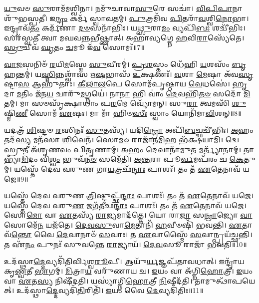 \-\ul{𑌯𑍁}\-𑌵𑍞 \ul{𑌸𑍁}\-𑌰𑌾𑌮᳴𑌮𑌶𑍍𑌵𑌿𑌨𑌾।
𑌨𑌮𑍁᳴𑌚𑌾𑌵𑌾\-\ul{𑌸𑍁}\-𑌰𑍇 𑌸𑌚𑌾॑।
\-\ul{𑌵𑌿}\-\-\ul{𑌪𑌿}\-\-\ul{𑌪𑌾}\-𑌨𑌾 𑌶𑍁᳴𑌭𑌸𑍍𑌪𑌤𑍀।
𑌇\-\ul{𑌨𑍍𑌦𑍍𑌰𑌂} 𑌕𑌰𑍍𑌮᳴ 𑌸𑍍𑌵𑌾𑌵𑌤𑌮𑍍।
\-\ul{𑌪𑍁}\-𑌤𑍍𑌰𑌮𑌿᳴𑌵 \ul{𑌪𑌿}\-𑌤𑌰𑌾᳴\-\ul{𑌵}\-𑌶𑍍𑌵𑌿\-\ul{𑌨𑍋}\-𑌭𑌾।
𑌇𑌨𑍍𑌦𑍍𑌰𑌾𑌵᳴\-\ul{𑌤𑌂} 𑌕𑌰𑍍𑌮᳴𑌣𑌾 \ul{𑌦}\-\-\ul{𑍞}\-𑌸𑌨𑌾᳴𑌭𑌿𑌃।
𑌯\-\ul{𑌥𑍍𑌸𑍁}\-𑌰𑌾\-\ul{𑌮𑌂} 𑌵𑍍𑌯𑌪𑌿᳴\-\ul{𑌬𑌃} 𑌶𑌚𑍀᳴𑌭𑌿𑌃।
𑌸𑌰᳴𑌸𑍍𑌵𑌤𑍀 𑌤𑍍𑌵𑌾 𑌮𑌘𑌵𑌨𑍍𑌨𑌭𑍀𑌷𑍍𑌣𑌾𑌤𑍍।
𑌅𑌹𑌾॑𑌵𑍍𑌯𑌗𑍍𑌨𑍇 \ul{𑌹}\-𑌵𑌿\-\ul{𑌰𑌾}\-𑌸𑍍𑌯𑍇᳴𑌤𑍇।
\-\ul{𑌸𑍍𑌰𑍁}\-𑌚𑍀𑌵᳴ \ul{𑌘𑍃}\-𑌤𑌂 \ul{𑌚}\-𑌮𑍂 𑌇᳴\-\ul{𑌵} 𑌸𑍋𑌮𑌃᳴॥7॥

\-\ul{𑌵𑌾}\-\-\ul{𑌜}\-𑌸𑌨𑌿𑍞᳴ \ul{𑌰}\-𑌯𑌿\-\ul{𑌮}\-𑌸𑍍𑌮𑍇 \ul{𑌸𑍁}\-𑌵𑍀𑌰𑌮𑍍॑।
\-\ul{𑌪𑍍𑌰}\-\-\ul{𑌶}\-𑌸𑍍𑌤𑌂 𑌧𑍇᳴𑌹𑌿 \ul{𑌯}\-𑌶𑌸𑌂᳴ \ul{𑌬𑍃}\-𑌹𑌨𑍍𑌤𑌮𑍍॑।
𑌯\-\ul{𑌸𑍍𑌮𑌿}\-𑌨𑍍𑌨𑌶𑍍𑌵𑌾᳴𑌸 𑌋\-\ul{𑌷}\-𑌭𑌾𑌸᳴ \ul{𑌉}\-𑌕𑍍𑌷𑌣𑌃᳴।
\-\ul{𑌵}\-𑌶𑌾 \ul{𑌮𑍇}\-𑌷𑌾 𑌅᳴𑌵\-\ul{𑌸𑍃}\-𑌷𑍍𑌟𑌾\-\ul{𑌸} 𑌆𑌹𑍁᳴𑌤𑌾𑌃।
\-\ul{𑌕𑍀}\-\-\ul{𑌲𑌾}\-\-\ul{𑌲}\-𑌪𑍇 𑌸𑍋𑌮᳴𑌪𑍃𑌷𑍍𑌠𑌾𑌯 \ul{𑌵𑍇}\-𑌧𑌸𑍇॑।
\-\ul{𑌹𑍃}\-𑌦𑌾 \ul{𑌮}\-𑌤𑌿𑌂 𑌜᳴𑌨\-\ul{𑌯} 𑌚𑌾𑌰𑍁᳴\-\ul{𑌮}\-𑌗𑍍𑌨𑌯𑍇॑।
𑌨𑌾\-\ul{𑌨𑌾} 𑌹𑌿 𑌵𑌾𑌂॑ \ul{𑌦𑍇}\-𑌵𑌹𑌿᳴\-\ul{𑌤}\-\-\ul{𑍞} 𑌸𑌦𑍋᳴ \ul{𑌮𑌿}\-𑌤𑌮𑍍।
𑌮𑌾 𑌸𑍞𑌸𑍃᳴𑌕𑍍𑌷𑌾𑌥𑌾𑌂 𑌪\-\ul{𑌰}\-𑌮𑍇 𑌵𑍍𑌯𑍋᳴𑌮𑌨𑍍।
𑌸𑍁\-\ul{𑌰𑌾} 𑌤𑍍𑌵𑌮𑌸𑌿᳴ \ul{𑌶𑍁}\-𑌷𑍍𑌮𑌿\-\ul{𑌣𑍀} 𑌸𑍋𑌮᳴ \ul{𑌏}\-𑌷𑌃।
𑌮𑌾 𑌮𑌾᳴ 𑌹𑌿𑍞\-\ul{𑌸𑍀𑌃} 𑌸𑍍𑌵𑌾𑌂 𑌯𑍋𑌨𑌿᳴𑌮𑌾\-\ul{𑌵𑌿}\-𑌶𑌨𑍍॥8॥

𑌯𑌦𑌤𑍍𑌰᳴ \ul{𑌶𑌿}\-𑌷𑍍𑌟𑍞 \ul{𑌰}\-𑌸𑌿𑌨𑌃᳴ \ul{𑌸𑍁}\-𑌤𑌸𑍍𑌯᳴।
𑌯𑌦𑌿\-\ul{𑌨𑍍𑌦𑍍𑌰𑍋} 𑌅𑌪𑌿᳴\-\ul{𑌬}\-𑌚𑍍𑌛𑌚𑍀᳴𑌭𑌿𑌃।
\-\ul{𑌅}\-𑌹𑌂 𑌤𑌦᳴\-\ul{𑌸𑍍𑌯} 𑌮𑌨᳴𑌸𑌾 \ul{𑌶𑌿}\-𑌵𑍇𑌨᳴।
𑌸𑍋\-\ul{𑌮}\-\-\ul{𑍞} 𑌰𑌾𑌜𑌾᳴𑌨\-\ul{𑌮𑌿}\-𑌹 𑌭᳴𑌕𑍍𑌷𑌯𑌾𑌮𑌿।
𑌦𑍍𑌵𑍇 \ul{𑌸𑍍𑌰𑍁}\-𑌤𑍀 𑌅᳴𑌶𑍃𑌣𑌵𑌂 𑌪𑌿\-\ul{𑌤𑍃}\-𑌣𑌾𑌮𑍍।
\-\ul{𑌅}\-𑌹𑌂 \ul{𑌦𑍇}\-𑌵𑌾𑌨𑌾᳴\-\ul{𑌮𑍁}\-𑌤 𑌮𑌰𑍍𑌤𑍍𑌯𑌾᳴𑌨𑌾𑌮𑍍।
𑌤𑌾𑌭𑍍𑌯𑌾᳴\-\ul{𑌮𑌿}\-𑌦𑌂 𑌵𑌿\-\ul{𑌶𑍍𑌵𑌂} 𑌭𑍁𑌵᳴\-\ul{𑌨}\-\-\ul{𑍞} 𑌸𑌮𑍇᳴𑌤𑌿।
\-\ul{𑌅}\-\-\ul{𑌨𑍍𑌤}\-𑌰𑌾 𑌪𑍂\-\ul{𑌰𑍍𑌵}\-𑌮𑌪᳴𑌰𑌂 𑌚 \ul{𑌕𑍇}\-𑌤𑍁𑌮𑍍।
𑌯𑌸𑍍𑌤𑍇᳴ 𑌦𑍇𑌵 𑌵𑌰𑍁𑌣 𑌗𑌾\-\ul{𑌯}\-𑌤𑍍𑌰𑌛᳴\-\ul{𑌨𑍍𑌦𑌾𑌃} 𑌪𑌾𑌶𑌃᳴।
𑌤𑌂 𑌤᳴ \ul{𑌏}\-𑌤𑍇𑌨𑌾𑌵᳴ 𑌯𑌜𑍇॥9॥

𑌯𑌸𑍍𑌤𑍇᳴ 𑌦𑍇𑌵 𑌵𑌰𑍁𑌣 \ul{𑌤𑍍𑌰𑌿}\-𑌷𑍍𑌟𑍁𑌪𑍍𑌛᳴\-\ul{𑌨𑍍𑌦𑌾𑌃} 𑌪𑌾𑌶𑌃᳴।
𑌤𑌂 𑌤᳴ \ul{𑌏}\-𑌤𑍇𑌨𑌾𑌵᳴ 𑌯𑌜𑍇।
𑌯𑌸𑍍𑌤𑍇᳴ 𑌦𑍇𑌵 𑌵𑌰𑍁\-\ul{𑌣} 𑌜𑌗᳴𑌤𑍀𑌛\-\ul{𑌨𑍍𑌦𑌾𑌃} 𑌪𑌾𑌶𑌃᳴।
𑌤𑌂 𑌤᳴ \ul{𑌏}\-𑌤𑍇𑌨𑌾𑌵᳴ 𑌯𑌜𑍇।
𑌸𑍋\-\ul{𑌮𑍋} 𑌵𑌾 \ul{𑌏}\-𑌤𑌸𑍍𑌯᳴ \ul{𑌰𑌾}\-𑌜𑍍𑌯𑌮𑌾𑌦᳴𑌤𑍍𑌤𑍇।
𑌯𑍋 𑌰𑌾\-\ul{𑌜𑌾} 𑌸\-\ul{𑌨𑍍𑌰𑌾}\-𑌜𑍍𑌯𑍋 \ul{𑌵𑌾} 𑌸𑍋𑌮𑍇᳴\-\ul{𑌨} 𑌯𑌜᳴𑌤𑍇।
\-\ul{𑌦𑍇}\-\-\ul{𑌵}\-\-\ul{𑌸𑍁}\-𑌵𑌾\-\ul{𑌮𑍇}\-𑌤𑌾𑌨𑌿᳴ \ul{𑌹}\-𑌵𑍀𑍞𑌷𑌿᳴ 𑌭𑌵𑌨𑍍𑌤𑌿।
\-\ul{𑌏}\-𑌤𑌾𑌵᳴\-\ul{𑌨𑍍𑌤𑍋} 𑌵𑍈 \ul{𑌦𑍇}\-𑌵𑌾𑌨𑌾𑍞᳴ \ul{𑌸}\-𑌵𑌾𑌃।
𑌤 \ul{𑌏}\-𑌵𑌾𑌸𑍍𑌮𑍈᳴ \ul{𑌸}\-𑌵𑌾𑌨𑍍𑌪𑍍𑌰𑌯᳴𑌚𑍍𑌛𑌨𑍍𑌤𑌿।
𑌤 𑌏᳴\-\ul{𑌨𑌂} 𑌪𑍁𑌨𑌃᳴ 𑌸𑍁𑌵𑌨𑍍𑌤𑍇 \ul{𑌰𑌾}\-𑌜𑍍𑌯𑌾𑌯᳴।
\-\ul{𑌦𑍇}\-\-\ul{𑌵}\-𑌸𑍂 𑌰𑌾𑌜𑌾᳴ 𑌭𑌵𑌤𑌿॥10॥\anuvakamend[𑌸𑍋𑌮᳴ 𑌆\-\ul{𑌵𑌿}\-𑌶𑌨𑍍 𑌯᳴𑌜𑍇 \ul{𑌰𑌾}\-𑌜𑍍𑌯𑌾𑌯𑍈𑌕𑌂᳴ 𑌚]

𑌉𑌦᳴𑌸𑍍𑌥𑌾\-\ul{𑌦𑍍𑌦𑍇}\-𑌵𑍍𑌯𑌦𑌿᳴𑌤𑌿𑌰𑍍𑌵𑌿𑌶𑍍𑌵\-\ul{𑌰𑍂}\-𑌪𑍀।
𑌆𑌯𑍁᳴\-\ul{𑌰𑍍𑌯}\-𑌜𑍍𑌞𑌪᳴𑌤𑌾𑌵𑌧𑌾𑌤𑍍।
𑌇𑌨𑍍𑌦𑍍𑌰𑌾᳴𑌯 𑌕𑍃\-\ul{𑌣𑍍𑌵}\-𑌤𑍀 \ul{𑌭𑌾}\-𑌗𑌮𑍍।
\-\ul{𑌮𑌿}\-𑌤𑍍𑌰𑌾\-\ul{𑌯} 𑌵𑌰𑍁᳴𑌣𑌾𑌯 𑌚।
\-\ul{𑌇}\-𑌯𑌂 𑌵𑌾 𑌅᳴𑌗𑍍𑌨𑌿\-\ul{𑌹𑍋}\-𑌤𑍍𑌰𑍀।
\-\ul{𑌇}\-𑌯𑌂 𑌵𑌾 \ul{𑌏}\-𑌤\-\ul{𑌸𑍍𑌯} 𑌨𑌿𑌷𑍀᳴𑌦𑌤𑌿।
𑌯𑌸𑍍𑌯𑌾॑𑌗𑍍𑌨𑌿\-\ul{𑌹𑍋}\-𑌤𑍍𑌰𑍀 \ul{𑌨𑌿}\-𑌷𑍀𑌦᳴𑌤𑌿।
𑌤𑌾𑌮𑍁𑌤𑍍𑌥𑌾᳴𑌪𑌯𑍇𑌤𑍍।
𑌉𑌦᳴𑌸𑍍𑌥𑌾\-\ul{𑌦𑍍𑌦𑍇}\-𑌵𑍍𑌯𑌦𑌿᳴\-\ul{𑌤𑌿}\-𑌰𑌿𑌤𑌿᳴।
\-\ul{𑌇}\-𑌯𑌂 𑌵𑍈 \ul{𑌦𑍇}\-𑌵𑍍𑌯𑌦𑌿᳴𑌤𑌿𑌃॥11॥

